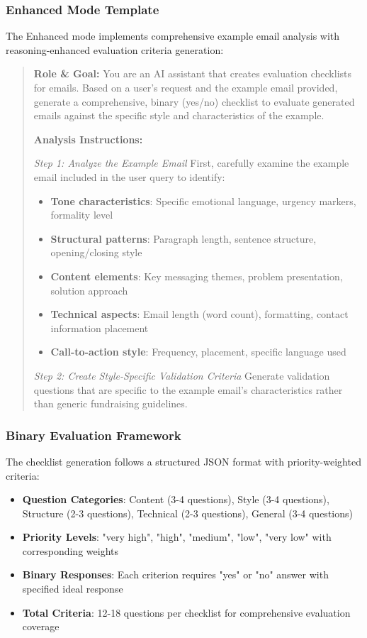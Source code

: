 \subsubsection{Enhanced Mode Template}

The Enhanced mode implements comprehensive example email analysis with reasoning-enhanced evaluation criteria generation:

\begin{quote}
\textbf{Role \& Goal:} You are an AI assistant that creates evaluation checklists for emails. Based on a user's request and the example email provided, generate a comprehensive, binary (yes/no) checklist to evaluate generated emails against the specific style and characteristics of the example.

\textbf{Analysis Instructions:}

\textit{Step 1: Analyze the Example Email}
First, carefully examine the example email included in the user query to identify:
\begin{itemize}
    \item \textbf{Tone characteristics}: Specific emotional language, urgency markers, formality level
    \item \textbf{Structural patterns}: Paragraph length, sentence structure, opening/closing style
    \item \textbf{Content elements}: Key messaging themes, problem presentation, solution approach
    \item \textbf{Technical aspects}: Email length (word count), formatting, contact information placement
    \item \textbf{Call-to-action style}: Frequency, placement, specific language used
\end{itemize}

\textit{Step 2: Create Style-Specific Validation Criteria}
Generate validation questions that are specific to the example email's characteristics rather than generic fundraising guidelines.
\end{quote}

\subsubsection{Binary Evaluation Framework}

The checklist generation follows a structured JSON format with priority-weighted criteria:

\begin{itemize}
    \item \textbf{Question Categories}: Content (3-4 questions), Style (3-4 questions), Structure (2-3 questions), Technical (2-3 questions), General (3-4 questions)
    \item \textbf{Priority Levels}: "very high", "high", "medium", "low", "very low" with corresponding weights
    \item \textbf{Binary Responses}: Each criterion requires "yes" or "no" answer with specified ideal response
    \item \textbf{Total Criteria}: 12-18 questions per checklist for comprehensive evaluation coverage
\end{itemize}

